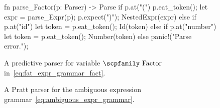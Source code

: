 \documentclass[
  oneside,
  english,
  coorientadorbanca,
  noabntexcite
]{ufsc-thesis-rn46-2019}
\newcommand{\codett}[1]{\text{\scpfamily#1}}
\newcommand{\bnfvar}[1]{\codett{#1}}
\begin{document}
\begin{figure}[ht]
  \centering
  \begin{minipage}{0.5\textwidth}
    \begin{rustcode}
fn parse_Factor(p: Parser) -> Parse {
  if p.at("(") {
    p.eat_token();
    let expr = parse_Expr(p);
    p.expect(")");
    NestedExpr(expr)
  } else if p.at("id") {
    let token = p.eat_token();
    Id(token)
  } else if p.at("number") {
    let token = p.eat_token();
    Number(token)
  } else {
    panic!("Parse error.");
  }
}
    \end{rustcode}
  \end{minipage}
  \caption{
    A predictive parser for variable $\bnfvar{Factor}$ in~\eqref{eq:fat_expr_grammar_fact}.
  }\label{fig:predictive_parser_fact}
\end{figure}

\begin{figure}
  \centering
  \begin{minipage}{0.9\textwidth}
  \end{minipage}
  \caption{
    A Pratt parser for the ambiguous expression grammar~\eqref{eq:ambiguous_expr_grammar}.
  }\label{fig:pratt_parser_expr_grammar}
\end{figure}
\end{document}
